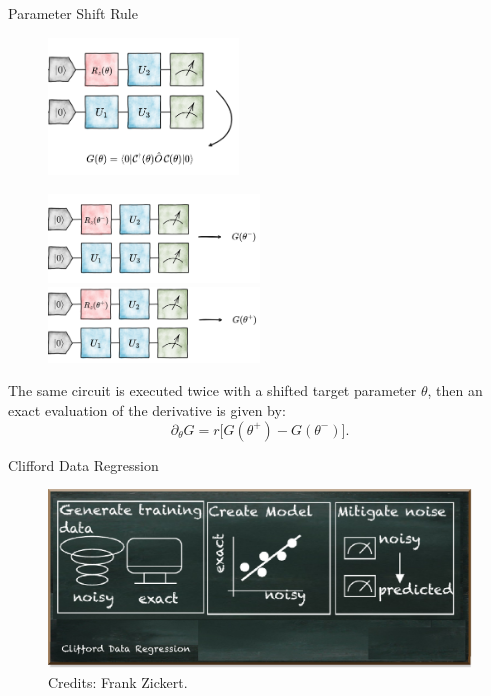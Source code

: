 \documentclass[8pt, xcolor={svgnames}, hyperref={linkcolor=black}]{beamer}
\begin{document}
\begin{frame}{Parameter Shift Rule}
\begin{multicols}{2}
\begin{figure}
    \includegraphics[width=0.45\textwidth]{figures/start.png}
\end{figure}
\begin{figure}  
    \includegraphics[width=0.5\textwidth]{figures/backward.png}
    \includegraphics[width=0.5\textwidth]{figures/forward.png}
\end{figure}
\end{multicols}

The same circuit is executed twice with a shifted target parameter $\theta$, then an 
exact evaluation of the derivative is given by:
$$ \partial_\theta G = r \bigl[ G(\theta^+) - G(\theta^-) \bigr]. $$
\end{frame}

\begin{frame}{Clifford Data Regression}
\begin{figure}
    \includegraphics[width=1\textwidth]{figures/cdr.png}
    \caption{Credits: Frank Zickert.}
\end{figure}
\end{frame}
\end{document}
